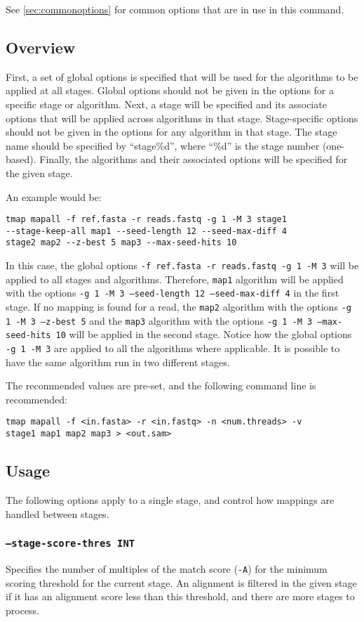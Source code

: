 \documentclass[a4paper,12pt]{book}
\newcommand{\TT}[1]{{\tt #1}} %
\begin{document}
See \autoref{sec:commonoptions} for common options that are in use in this command.

\subsection{Overview}
First, a set of global options is specified that will be used for the algorithms to be applied at all stages.
Global options should not be given in the options for a specific stage or algorithm.
Next, a stage will be specified and its associate options that will be applied across algorithms in that stage.
Stage-specific options should not be given in the options for any algorithm in that stage.
The stage name should be specified by ``stage\%d'', where ``\%d'' is the stage number (one-based).
Finally, the algorithms and their associated options will be specified for the given stage.

An example would be:
\begin{verbatim}
tmap mapall -f ref.fasta -r reads.fastq -g 1 -M 3 stage1 
--stage-keep-all map1 --seed-length 12 --seed-max-diff 4 
stage2 map2 --z-best 5 map3 --max-seed-hits 10
\end{verbatim}
In this case, the global options \TT{-f ref.fasta -r reads.fastq -g 1 -M 3} will be applied to all stages and algorithms. 
Therefore, \TT{map1} algorithm will be applied with the options \TT{-g 1 -M 3 --seed-length 12 --seed-max-diff 4} in the first stage.
If no mapping is found for a read, the \TT{map2} algorithm with the options \TT{-g 1 -M 3 --z-best 5} and the \TT{map3} algorithm with the options \TT{-g 1 -M 3 --max-seed-hits 10} will be applied in the second stage.
Notice how the global options \TT{-g 1 -M 3} are applied to all the algorithms where applicable.
It is possible to have the same algorithm run in two different stages.

The recommended values are pre-set, and the following command line is recommended:
\begin{verbatim}
tmap mapall -f <in.fasta> -r <in.fastq> -n <num.threads> -v 
stage1 map1 map2 map3 > <out.sam>
\end{verbatim}

\subsection{Usage}
The following options apply to a single stage, and control how mappings are handled between stages.
\subsubsection{\TT{--stage-score-thres INT}}
Specifies the number of multiples of the match score (\TT{-A}) for the minimum scoring threshold for the current  stage.
An alignment is filtered in the given stage if it has an alignment score less than this threshold, and there are more stages to process.
\end{document}
